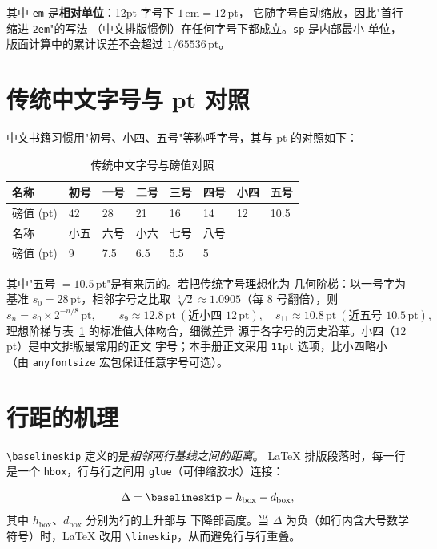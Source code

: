 其中 \texttt{em} 是\textbf{相对单位}：12pt 字号下 $1\,\mathrm{em}=12$\,pt，
它随字号自动缩放，因此"首行缩进 \texttt{2em}"的写法
（中文排版惯例）在任何字号下都成立。\texttt{sp} 是内部最小
单位，版面计算中的累计误差不会超过 $1/65536$\,pt。

\section{传统中文字号与 pt 对照}

中文书籍习惯用"初号、小四、五号"等称呼字号，其与 pt 的对照如下：

\begin{table}[htbp]
  \centering
  \caption{传统中文字号与磅值对照}\label{tab:chinesefont}
  \begin{tabular}{llllllll}
    \toprule
    名称 & 初号 & 一号 & 二号 & 三号 & 四号 & 小四 & 五号 \\
    \midrule
    磅值 (pt) & 42 & 28 & 21 & 16 & 14 & 12 & 10.5 \\
    名称 & 小五 & 六号 & 小六 & 七号 & 八号 & & \\
    \midrule
    磅值 (pt) & 9 & 7.5 & 6.5 & 5.5 & 5 & & \\
    \bottomrule
  \end{tabular}
\end{table}

其中"五号 $=10.5$\,pt"是有来历的。若把传统字号理想化为
几何阶梯：以一号字为基准 $s_0=28$\,pt，相邻字号之比取
$\sqrt[8]{2}\approx1.0905$（每 8 号翻倍），则
\begin{equation}
  s_n = s_0 \times 2^{-n/8}\,\mathrm{pt},
  \qquad
  s_{9} \approx 12.8\,\mathrm{pt}\ (\text{近小四 }12\,\mathrm{pt}),\quad
  s_{11} \approx 10.8\,\mathrm{pt}\ (\text{近五号 }10.5\,\mathrm{pt}),
  \label{eq:cnfontsize}
\end{equation}
理想阶梯与表~\ref{tab:chinesefont} 的标准值大体吻合，细微差异
源于各字号的历史沿革。小四（$12$\,pt）是中文排版最常用的正文
字号；本手册正文采用 \texttt{11pt} 选项，比小四略小
（由 \texttt{anyfontsize} 宏包保证任意字号可选）。

\section{行距的机理}

\verb|\baselineskip| 定义的是\emph{相邻两行基线之间的距离}。
LaTeX 排版段落时，每一行是一个 \texttt{hbox}，行与行之间用
\texttt{glue}（可伸缩胶水）连接：

\begin{equation}
  \Delta = \verb|\baselineskip| - h_{\mathrm{box}} - d_{\mathrm{box}},
  \label{eq:glue}
\end{equation}
其中 $h_{\mathrm{box}}$、$d_{\mathrm{box}}$ 分别为行的上升部与
下降部高度。当 $\Delta$ 为负（如行内含大号数学符号）时，LaTeX
改用 \verb|\lineskip|，从而避免行与行重叠。

